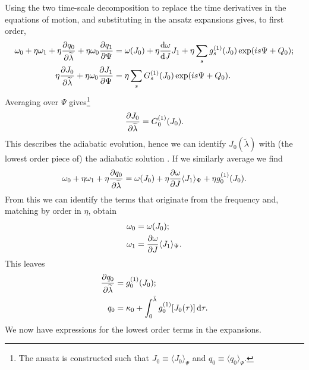 Using the two time-scale decomposition to replace the time derivatives in the equations of motion, and substituting in the ansatz expansions gives, to first order,
\begin{subequations}
\begin{align}
\label{eq:q-1}
\omega_0 + \eta\omega_1 + \eta\dfrac{\partial {q_0}}{\partial {\widetilde{\lambda}}} + \eta\omega_0\dfrac{\partial {q_1}}{\partial {\Psi}} = {} & \omega(J_0) + \eta\dfrac{\mathrm{d} {\omega}}{\mathrm{d} {J}}J_1 + \eta \sum_s g_s^{(1)}(J_0)\exp(is \Psi + Q_0); \\
\eta\dfrac{\partial {J_0}}{\partial {\widetilde{\lambda}}} + \eta\omega_0\dfrac{\partial {J_1}}{\partial {\Psi}} = {} & \eta \sum_s G_s^{(1)}(J_0)\exp(is \Psi + Q_0).
\label{eq:J-1}
\end{align}
\end{subequations}
Averaging  over $\Psi$ gives\footnote{The ansatz is constructed such that $J_0 \equiv \langle J_0\rangle_\Psi$ and $q_0 \equiv \langle q_0\rangle_\Psi$.}
\begin{equation}
\dfrac{\partial {J_0}}{\partial {\widetilde{\lambda}}} = G_0^{(1)}(J_0).
\label{eq:J-ad}
\end{equation}
This describes the adiabatic evolution, hence we can identify $J_0\left(\widetilde{\lambda}\right)$ with (the lowest order piece of) the adiabatic solution \citep{Hinderer2008}. If we similarly average  we find
\begin{equation}
\omega_0 + \eta\omega_1 +\eta\dfrac{\partial {q_0}}{\partial {\widetilde{\lambda}}} = \omega(J_0) + \eta\dfrac{\partial {\omega}}{\partial {J}}\langle J_1\rangle_\Psi + \eta g_0^{(1)}(J_0).
\end{equation}
From this we can identify the terms that originate from the frequency and, matching by order in $\eta$, obtain
\begin{subequations}
\begin{align}
\omega_0 = {} & \omega(J_0); \\
\omega_1 = {} & \dfrac{\partial {\omega}}{\partial {J}}\langle J_1\rangle_\Psi.
\end{align}
\end{subequations}
This leaves
\begin{align}
\dfrac{\partial {q_0}}{\partial {\widetilde{\lambda}}} = {} & g_0^{(1)}(J_0); \\
q_0 = {} & \kappa_0 + \int_{0}^{\tilde{\lambda}}{g_0^{(1)}[J_0(\tau)]}\,\mathrm{d}{\tau}.
\label{eq:q-0-sol}
\end{align}
We now have expressions for the lowest order terms in the expansions.


